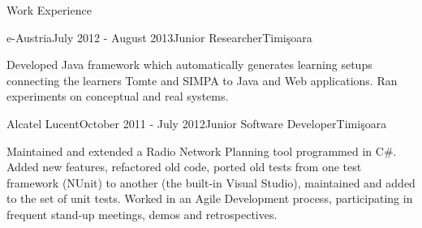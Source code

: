 \documentclass{resume} %
\begin{document}
\begin{rSection}{Work Experience}
\begin{rSubsection}{e-Austria}{July 2012 - August 2013}{Junior Researcher}{Timi\c{s}oara}
\item Developed Java framework which automatically generates learning setups connecting the learners Tomte and SIMPA to Java and Web applications. Ran experiments on conceptual and real systems.
\end{rSubsection}



\begin{rSubsection}{Alcatel Lucent}{October 2011 - July 2012}{Junior Software Developer}{Timi\c{s}oara}
\item Maintained and extended a Radio Network Planning tool programmed in C\#. Added new features, refactored old code, ported old tests from one test framework (NUnit) to another (the built-in Visual Studio), maintained and added to the set of unit tests. Worked in an Agile Development process, participating in frequent stand-up meetings, demos and retrospectives.
\end{rSubsection}
\end{rSection}

\end{document}
